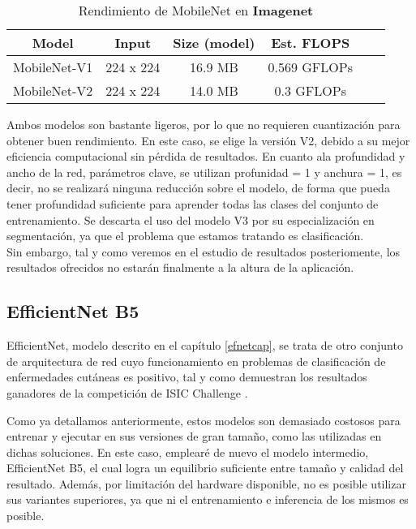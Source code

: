 \begin{table}[!ht]
	\centering
	\begin{tabular}{|c|c|c|c|c|c|}
		\hline
		\textbf{Model} & \textbf{Input} & \textbf{Size (model)} & \textbf{Est. FLOPS}  \\ \hline
		MobileNet-V1 & 224 x 224 & 16.9 MB & 0.569 GFLOPs \\ \hline
		MobileNet-V2 & 224 x 224 & 14.0 MB & 0.3 GFLOPs	  \\ \hline
	\end{tabular}
		\caption{Rendimiento de MobileNet en \textbf{Imagenet} \cite{mobilespecs}}
\end{table}

Ambos modelos son bastante ligeros, por lo que no requieren cuantización para obtener buen rendimiento. En este caso, se elige la versión V2, debido a su mejor eficiencia computacional sin pérdida de resultados. En cuanto ala profundidad y ancho de la red, parámetros clave, se utilizan profunidad = 1 y anchura = 1, es decir, no se realizará ninguna reducción sobre el modelo, de forma que pueda tener profundidad suficiente para aprender todas las clases del conjunto de entrenamiento. Se descarta el uso del modelo V3 por su especialización en segmentación, ya que el problema que estamos tratando es clasificación.\\

Sin embargo, tal y como veremos en el estudio de resultados posteriomente, los resultados ofrecidos no estarán finalmente a la altura de la aplicación.


\subsection{EfficientNet B5}

EfficientNet, modelo descrito en el capítulo \ref{efnetcap},  se trata de otro conjunto de arquitectura de red cuyo funcionamiento en problemas de clasificación de enfermedades cutáneas es positivo, tal y como demuestran los resultados ganadores de la competición de ISIC Challenge \cite{1stISIC, 2ndISIC}.

Como ya detallamos anteriormente, estos modelos son demasiado costosos para entrenar y ejecutar en sus versiones de gran tamaño, como las utilizadas en dichas soluciones. En este caso, emplearé de nuevo el modelo intermedio, EfficientNet B5, el cual logra un equilibrio suficiente entre tamaño y calidad del resultado. Además, por limitación del hardware disponible, no es posible utilizar sus variantes superiores, ya que ni el entrenamiento e inferencia de los mismos es posible.

